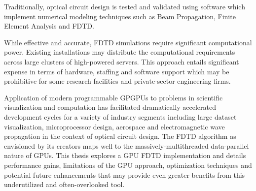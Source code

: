 
Traditionally, optical circuit design is tested and validated using software which implement numerical modeling techniques such as Beam Propagation, Finite Element Analysis and FDTD.

While effective and accurate, FDTD simulations require significant computational power. Existing installations may distribute the computational requirements across large clusters of high-powered servers. This approach entails significant expense in terms of hardware, staffing and software support which may be prohibitive for some research facilities and private-sector engineering firms.

Application of modern programmable GPGPUs to problems in scientific visualization and computation has facilitated dramatically accelerated development cycles for a variety of industry segments including large dataset visualization, microprocessor design, aerospace and electromagnetic wave propagation in the context of optical circuit design.
The FDTD algorithm as envisioned by its creators maps well to the massively-multithreaded data-parallel nature of GPUs. This thesis explores a GPU FDTD implementation and details performance gains, limitations of the GPU approach, optimization techniques and potential future enhancements that may provide even greater benefits from this underutilized and often-overlooked tool. 